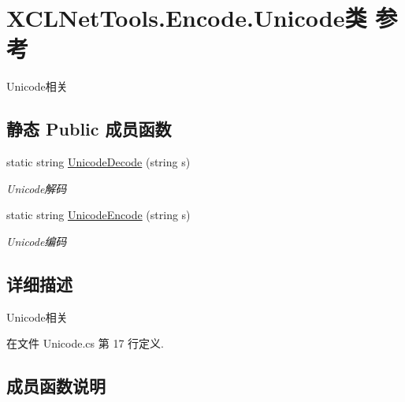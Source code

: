\hypertarget{class_x_c_l_net_tools_1_1_encode_1_1_unicode}{}\section{X\+C\+L\+Net\+Tools.\+Encode.\+Unicode类 参考}
\label{class_x_c_l_net_tools_1_1_encode_1_1_unicode}


Unicode相关  


\subsection*{静态 Public 成员函数}
\begin{DoxyCompactItemize}
\item 
static string \hyperlink{class_x_c_l_net_tools_1_1_encode_1_1_unicode_a355629b67a747e427899bead878f8758}{Unicode\+Decode} (string s)
\begin{DoxyCompactList}\small\item\em Unicode解码 \end{DoxyCompactList}\item 
static string \hyperlink{class_x_c_l_net_tools_1_1_encode_1_1_unicode_afbe245ddbaa5d6364985380483f2f8ba}{Unicode\+Encode} (string s)
\begin{DoxyCompactList}\small\item\em Unicode编码 \end{DoxyCompactList}\end{DoxyCompactItemize}


\subsection{详细描述}
Unicode相关 



在文件 Unicode.\+cs 第 17 行定义.



\subsection{成员函数说明}
\mbox{\label{class_x_c_l_net_tools_1_1_encode_1_1_unicode_a355629b67a747e427899bead878f8758}} 
